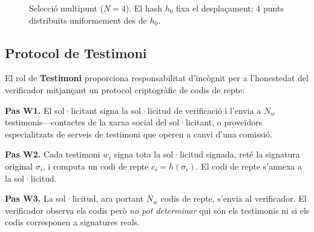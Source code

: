 \documentclass[11pt,a4paper,twocolumn]{article}
\begin{document}
\begin{figure}[ht]
\centering
{}
\caption{Selecció multipunt ($N{=}4$). El hash $h_0$ fixa el desplaçament; 4 punts distribuïts uniformement des de $h_0$.}
\label{fig:multipoint}
\end{figure}

\subsection{Protocol de Testimoni}

El rol de \textbf{Testimoni} proporciona responsabilitat d'incògnit per a l'honestedat del verificador mitjançant un protocol criptogràfic de codis de repte:

\textbf{Pas W1.} El sol·licitant signa la sol·licitud de verificació i l'envia a $N_w$ testimonis---contactes de la xarxa social del sol·licitant, o proveïdors especialitzats de serveis de testimoni que operen a canvi d'una comissió.

\textbf{Pas W2.} Cada testimoni $w_i$ signa tota la sol·licitud signada, reté la signatura original $\sigma_i$, i computa un codi de repte $c_i = h(\sigma_i)$. El codi de repte s'annexa a la sol·licitud.

\textbf{Pas W3.} La sol·licitud, ara portant $N_w$ codis de repte, s'envia al verificador. El verificador observa els codis però \emph{no pot determinar} qui són els testimonis ni si els codis corresponen a signatures reals.
\end{document}
